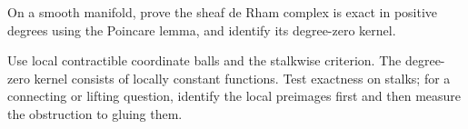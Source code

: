 \begin{problem}\label{chal:vi16-03}
On a smooth manifold, prove the sheaf de Rham complex is exact in positive degrees using the Poincare lemma, and identify its degree-zero kernel.
\end{problem}
\begin{hint}
Use local contractible coordinate balls and the stalkwise criterion.  The degree-zero kernel consists of locally constant functions. Test exactness on stalks; for a connecting or lifting question, identify the local preimages first and then measure the obstruction to gluing them.
\end{hint}
